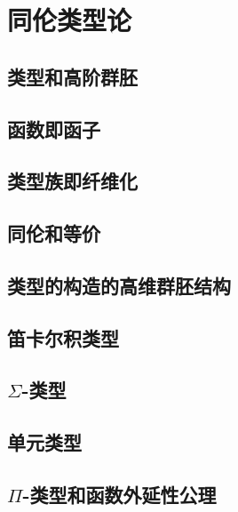 \chapter{同伦类型论}
\label{cha:basics}


\section{类型和高阶群胚}
\label{sec:equality}


\section{函数即函子}
\label{sec:functors}


\section{类型族即纤维化}
\label{sec:fibrations}


\section{同伦和等价}
\label{sec:basics-equivalences}


\section{类型的构造的高维群胚结构}
\label{sec:computational}


\section{笛卡尔积类型}
\label{sec:compute-cartprod}


\section{\texorpdfstring{$\Sigma$}{Σ}-类型}
\label{sec:compute-sigma}


\section{单元类型}
\label{sec:compute-unit}


\section{\texorpdfstring{$\Pi$}{Π}-类型和函数外延性公理}
\label{sec:compute-pi}


